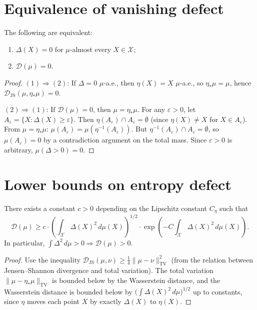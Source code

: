 \documentclass[12pt, oneside]{memoir}
\newcommand{\X}{\mathcal{X}}
\newcommand{\Djs}{\mathcal{D}_{\mathrm{JS}}}
\newcommand{\nnorm}[1]{\lVert #1 \rVert}
\begin{document}
\section{Equivalence of vanishing defect}

\begin{theorem}
\label{thm:defect-equiv}
The following are equivalent:
\begin{enumerate}
  \item $\Delta(X) = 0$ for $\mu$-almost every $X \in \X$;
  \item $\mathcal{D}(\mu) = 0$.
\end{enumerate}
\end{theorem}

\begin{proof}
$(1) \Rightarrow (2)$: If $\Delta = 0$ $\mu$-a.e., then $\eta(X) = X$ $\mu$-a.e., so
$\eta_*\mu = \mu$, hence $\Djs(\mu, \eta_*\mu) = 0$.

$(2) \Rightarrow (1)$: If $\mathcal{D}(\mu) = 0$, then $\mu = \eta_*\mu$.  For any
$\varepsilon > 0$, let $A_\varepsilon = \{X : \Delta(X) \ge \varepsilon\}$.  Then
$\eta(A_\varepsilon) \cap A_\varepsilon = \emptyset$ (since $\eta(X) \ne X$ for $X \in
A_\varepsilon$).  From $\mu = \eta_*\mu$: $\mu(A_\varepsilon) = \mu(\eta^{-1}(A_\varepsilon))$.
But $\eta^{-1}(A_\varepsilon) \cap A_\varepsilon = \emptyset$, so $\mu(A_\varepsilon) =
0$ by a contradiction argument on the total mass.  Since $\varepsilon > 0$ is arbitrary,
$\mu(\Delta > 0) = 0$.
\end{proof}

\section{Lower bounds on entropy defect}

\begin{proposition}
\label{prop:moment-bound}
There exists a constant $c > 0$ depending on the Lipschitz constant $C_\eta$ such that
\[
  \mathcal{D}(\mu) \ge c \cdot \left(\int_\X \Delta(X)^2\, d\mu(X)\right)^{1/2}
  \cdot \exp\left(-C \int_\X \Delta(X)^2\, d\mu(X)\right).
\]
In particular, $\int \Delta^2\, d\mu > 0 \Rightarrow \mathcal{D}(\mu) > 0$.
\end{proposition}

\begin{proof}
Use the inequality $\Djs(\mu, \nu) \ge \frac{1}{4} \nnorm{\mu - \nu}_{\mathrm{TV}}^2$
(from the relation between Jensen--Shannon divergence and total variation).  The total
variation $\nnorm{\mu - \eta_*\mu}_{\mathrm{TV}}$ is bounded below by the Wasserstein
distance, and the Wasserstein distance is bounded below by
$\bigl(\int \Delta(X)^2\, d\mu\bigr)^{1/2}$ up to constants, since $\eta$ moves each
point $X$ by exactly $\Delta(X)$ to $\eta(X)$.
\end{proof}
\end{document}

